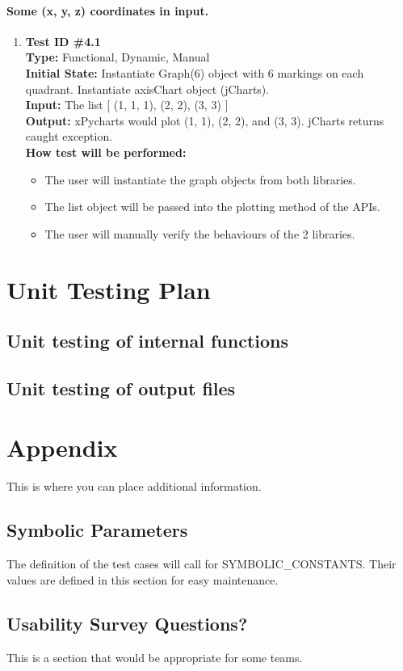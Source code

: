 \documentclass[12pt, titlepage]{article}
\begin{document}
	\paragraph{Some (x, y, z) coordinates in input.}
		\begin{enumerate}
			\item{\textbf{Test ID \#4.1\\}}
			\textbf{Type:} Functional, Dynamic, Manual\\
			\textbf{Initial State:} Instantiate Graph(6) object with 6 markings on each quadrant. Instantiate axisChart object (jCharts).\\	
			\textbf{Input:} The list [ (1, 1, 1), (2, 2), (3, 3) ] \\
			\textbf{Output:}    xPycharts would plot (1, 1), (2, 2), and (3, 3). jCharts returns caught exception.  \\
			\textbf{How test will be performed:}
				\begin{itemize}[label={--}]
					\item The user will instantiate the graph objects from both libraries. 
					\item The list object will be passed into the plotting method of the APIs.
					\item The user will manually verify the behaviours of the 2 libraries.
				\end{itemize}					
	\end{enumerate}

				
\section{Unit Testing Plan}
		
\subsection{Unit testing of internal functions}
		
\subsection{Unit testing of output files}		


\newpage
\section{Appendix}
This is where you can place additional information.
\subsection{Symbolic Parameters}
The definition of the test cases will call for SYMBOLIC\_CONSTANTS.
Their values are defined in this section for easy maintenance.
\subsection{Usability Survey Questions?}
This is a section that would be appropriate for some teams.
\end{document}
